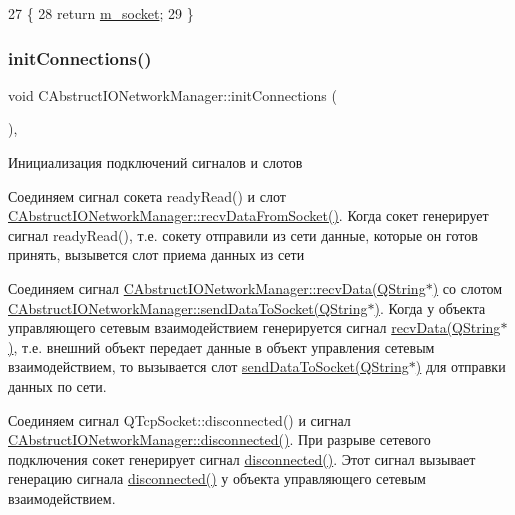 \begin{DoxyCode}
27 \{
28     \textcolor{keywordflow}{return} \hyperlink{class_c_abstruct_i_o_network_manager_a0c8754d8191c83c660f43b8c89e39d4e}{m\_socket};
29 \}
\end{DoxyCode}
\hypertarget{class_c_abstruct_i_o_network_manager_ac01bfefacfa37050c8d3a9317a38fbf5}{}\label{class_c_abstruct_i_o_network_manager_ac01bfefacfa37050c8d3a9317a38fbf5} 
\subsubsection{\texorpdfstring{init\+Connections()}{initConnections()}}
{\footnotesize\ttfamily void C\+Abstruct\+I\+O\+Network\+Manager\+::init\+Connections (\begin{DoxyParamCaption}{ }\end{DoxyParamCaption})\hspace{0.3cm}{\ttfamily [protected]}, {\ttfamily [virtual]}}



Инициализация подключений сигналов и слотов 

Соединяем сигнал сокета ready\+Read() и слот \hyperlink{class_c_abstruct_i_o_network_manager_a78756fc08ed619162da210a9cfc09208}{C\+Abstruct\+I\+O\+Network\+Manager\+::recv\+Data\+From\+Socket()}. Когда сокет генерирует сигнал ready\+Read(), т.\+е. сокету отправили из сети данные, которые он готов принять, вызывется слот приема данных из сети

Соединяем сигнал \hyperlink{class_c_abstruct_controller_item_a6898e48061cb0cac2065f8193bd386c1}{C\+Abstruct\+I\+O\+Network\+Manager\+::recv\+Data(\+Q\+String$\ast$)} со слотом \hyperlink{class_c_abstruct_i_o_network_manager_a7e6c20ce1264c76a2cc66114f8490629}{C\+Abstruct\+I\+O\+Network\+Manager\+::send\+Data\+To\+Socket(\+Q\+String$\ast$)}. Когда у объекта управляющего сетевым взаимодействием генерируется сигнал \hyperlink{class_c_abstruct_controller_item_a6898e48061cb0cac2065f8193bd386c1}{recv\+Data(\+Q\+String$\ast$)}, т.\+е. внешний объект передает данные в объект управления сетевым взаимодействием, то вызывается слот \hyperlink{class_c_abstruct_i_o_network_manager_a7e6c20ce1264c76a2cc66114f8490629}{send\+Data\+To\+Socket(\+Q\+String$\ast$)} для отправки данных по сети.

Соединяем сигнал Q\+Tcp\+Socket\+::disconnected() и сигнал \hyperlink{class_c_abstruct_i_o_network_manager_a4c25afd753612c5c719944a3e8ef4373}{C\+Abstruct\+I\+O\+Network\+Manager\+::disconnected()}. При разрыве сетевого подключения сокет генерирует сигнал \hyperlink{class_c_abstruct_i_o_network_manager_a4c25afd753612c5c719944a3e8ef4373}{disconnected()}. Этот сигнал вызывает генерацию сигнала \hyperlink{class_c_abstruct_i_o_network_manager_a4c25afd753612c5c719944a3e8ef4373}{disconnected()} у объекта управляющего сетевым взаимодействием.

